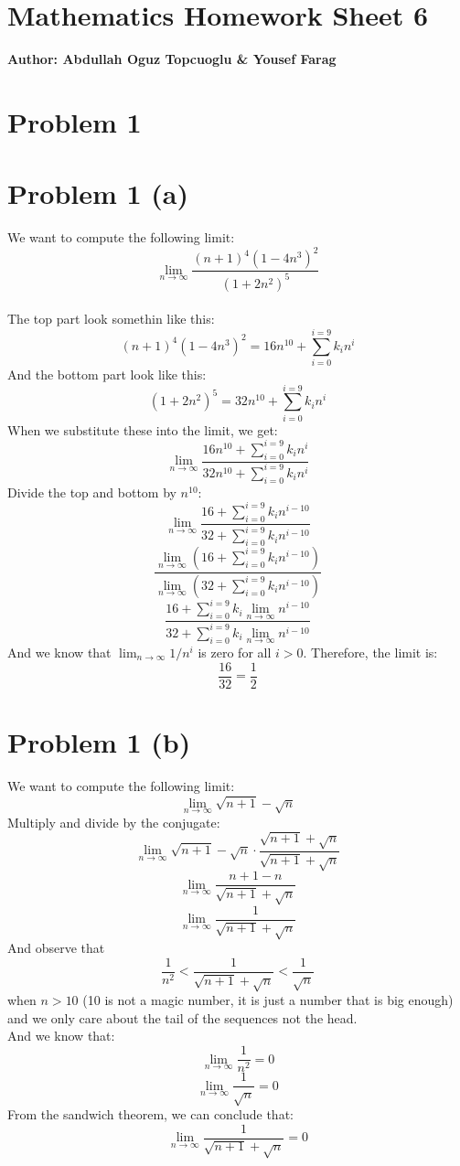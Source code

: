 \documentclass{article}
\begin{document}
\section*{\huge Mathematics Homework Sheet 6}
\begin{flushright}
   \textbf{Author: Abdullah Oguz Topcuoglu \& Yousef Farag}
\end{flushright}

\section*{Problem 1}
\section*{Problem 1 (a)}
We want to compute the following limit:
\[
   \lim_{n \rightarrow \infty} \frac{(n+1)^4(1 - 4n^3)^2}{(1+2n^2)^5}
\]
\\
The top part look somethin like this:
\[
   (n+1)^4(1 - 4n^3)^2 = 16n^{10} + \sum_{i = 0}^{i = 9} k_in^i
\]
And the bottom part look like this:
\[
   (1+2n^2)^5 = 32n^{10} + \sum_{i = 0}^{i = 9} k_in^i
\]
When we substitute these into the limit, we get:
\[
   \lim_{n \rightarrow \infty} \frac{16n^{10} + \sum_{i = 0}^{i = 9} k_in^i}{32n^{10} + \sum_{i = 0}^{i = 9} k_in^i}
\]
Divide the top and bottom by $n^{10}$:
\[
   \lim_{n \rightarrow \infty} \frac{16 + \sum_{i = 0}^{i = 9} k_in^{i-10}}{32 + \sum_{i = 0}^{i = 9} k_in^{i-10}}
\]
\[
   \frac{\lim_{n \rightarrow \infty}(16 + \sum_{i = 0}^{i = 9} k_in^{i-10})}{\lim_{n \rightarrow \infty}(32 + \sum_{i = 0}^{i = 9} k_in^{i-10})}
\]
\[
   \frac{16 + \sum_{i = 0}^{i = 9} k_i\lim_{n \rightarrow \infty}n^{i-10}}{32 + \sum_{i = 0}^{i = 9} k_i\lim_{n \rightarrow \infty}n^{i-10}}
\]
And we know that \(\lim_{n \rightarrow \infty} 1/n^i\) is zero for all \(i > 0\). Therefore, the limit is:
\[
   \frac{16}{32} = \frac{1}{2}
\]

\section*{Problem 1 (b)}
We want to compute the following limit:
\[
   \lim_{n \rightarrow \infty} \sqrt{n+1} - \sqrt{n}
\]
Multiply and divide by the conjugate:
\[
   \lim_{n \rightarrow \infty} \sqrt{n+1} - \sqrt{n} \cdot \frac{\sqrt{n+1} + \sqrt{n}}{\sqrt{n+1} + \sqrt{n}}
\]
\[
   \lim_{n \rightarrow \infty} \frac{n+1 - n}{\sqrt{n+1} + \sqrt{n}}
\]
\[
   \lim_{n \rightarrow \infty} \frac{1}{\sqrt{n+1} + \sqrt{n}}
\]
And observe that
\[
   \frac{1}{n^2} < \frac{1}{\sqrt{n+1} + \sqrt{n}} < \frac{1}{\sqrt{n}}
\]
when \(n > 10\) (10 is not a magic number, it is just a number that is big enough) 
and we only care about the tail of the sequences not the head.\\
And we know that:
\[
   \lim_{n \rightarrow \infty} \frac{1}{n^2} = 0
\]
\[
   \lim_{n \rightarrow \infty} \frac{1}{\sqrt{n}} = 0
\]
From the sandwich theorem, we can conclude that:
\[
   \lim_{n \rightarrow \infty} \frac{1}{\sqrt{n+1} + \sqrt{n}} = 0
\]
\end{document}
